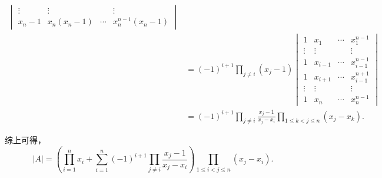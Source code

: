 \begin{exercise}
\begin{exgroup}
\begin{answer}
\begin{align*}
\begin{vmatrix}
                    \vdots    & \vdots              &        & \vdots                    \\
                    x_n-1     & x_n (x_n-1)         & \cdots & x_n^{n-1} (x_n-1)
                \end{vmatrix} \\
                &= (-1)^{i+1} \prod_{j \neq i} (x_j - 1) \begin{vmatrix}
                    1      & x_1     & \cdots & x_1^{n-1}     \\
                    \vdots & \vdots  &        & \vdots        \\
                    1      & x_{i-1} & \cdots & x_{i-1}^{n-1} \\
                    1      & x_{i+1} & \cdots & x_{i-1}^{n+1} \\
                    \vdots & \vdots  &        & \vdots        \\
                    1      & x_n     & \cdots & x_n^{n-1}
                \end{vmatrix} \\
                &= (-1)^{i+1} \prod_{j \neq i} \frac{x_j - 1}{x_j - x_i} \prod_{1 \leqslant k < j \leqslant n} (x_j - x_k).
            \end{align*}

            综上可得，
            \[
                |A| = \left( \prod_{i=1}^n x_i + \sum_{i=1}^n (-1)^{i+1} \prod_{j \neq i} \frac{x_j - 1}{x_j - x_i} \right) \prod_{1 \leqslant i < j \leqslant n} (x_j - x_i).
            \]

        \end{answer}


\end{exgroup}
\end{exercise}
